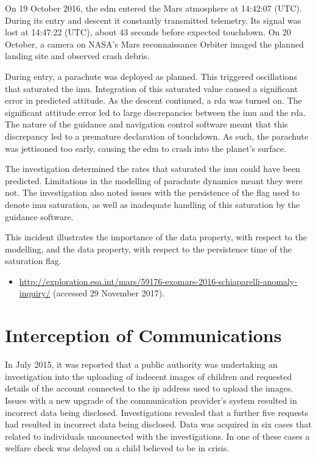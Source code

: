 On 19 October 2016, the \gls{edm} entered the Mars atmosphere at 14:42:07 (UTC). During its entry and descent it constantly transmitted telemetry. Its signal was lost at 14:47:22 (UTC), about 43 seconds before expected touchdown. On 20 October, a camera on NASA's Mars reconnaissance Orbiter imaged the planned landing site and observed crash debris.

During entry, a parachute was deployed as planned. This triggered oscillations that saturated the \gls{imu}. Integration of this saturated value caused a significant error in predicted attitude. As the descent continued, a \gls{rda} was turned on. The significant attitude error led to large discrepancies between the \gls{imu} and the \gls{rda}. The nature of the guidance and navigation control software meant that this discrepancy led to a premature declaration of touchdown. As such, the parachute was jettisoned too early, causing the \gls{edm} to crash into the planet's surface.

The investigation determined the rates that saturated the \gls{imu} could have been predicted. Limitations in the modelling of parachute dynamics meant they were not. The investigation also noted issues with the persistence of the flag used to denote \gls{imu} saturation, as well as inadequate handling of this saturation by the guidance software.

This incident illustrates the importance of the  \gls{data property}, with respect to the modelling, and the  \gls{data property}, with respect to the persistence time of the saturation flag.

\begin{samepage}
\begin{itemize}
	\item \raggedright{\href{http://exploration.esa.int/mars/59176-exomars-2016-schiaparelli-anomaly-inquiry/}{http://exploration.esa.int/mars/59176-exomars-2016-schiaparelli-anomaly-inquiry/} (accessed 29 November 2017).}
\end{itemize}
\end{samepage}


\section{Interception of Communications} \label{bkm:incacc:comintercept}
In July 2015, it was reported that a public authority was undertaking an investigation into the uploading of indecent images of children and requested details of the account connected to the \gls{ip} address used to upload the images. Issues with a new upgrade of the communication provider's system resulted in incorrect data being disclosed. Investigations revealed that a further five requests had resulted in incorrect data being disclosed. Data was acquired in six cases that related to individuals unconnected with the investigations. In one of these cases a welfare check was delayed on a child believed to be in crisis.

